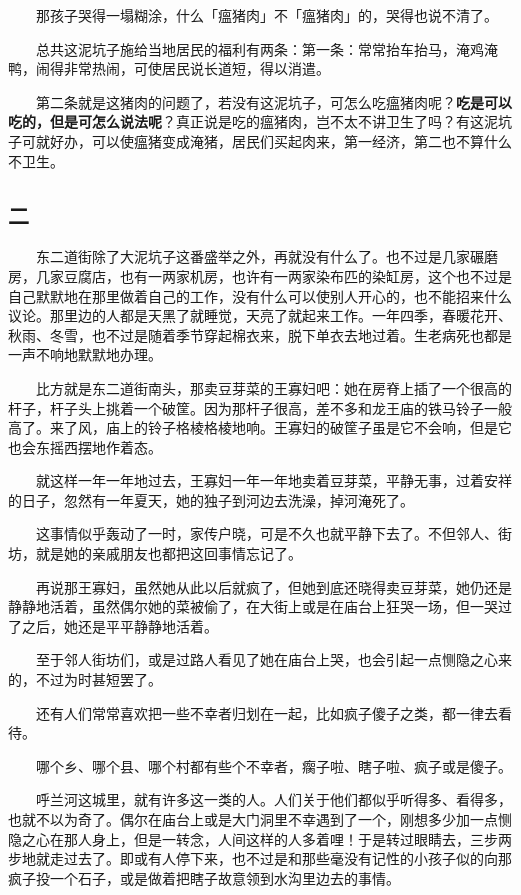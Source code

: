\documentclass[UTF8]{ctexart}
\begin{document}
　　那孩子哭得一塌糊涂，什么「瘟猪肉」不「瘟猪肉」的，哭得也说不清了。

　　总共这泥坑子施给当地居民的福利有两条：第一条：常常抬车抬马，淹鸡淹鸭，闹得非常热闹，可使居民说长道短，得以消遣。

　　第二条就是这猪肉的问题了，若没有这泥坑子，可怎么吃瘟猪肉呢？\textbf{吃是可以吃的，但是可怎么说法呢}？真正说是吃的瘟猪肉，岂不太不讲卫生了吗？有这泥坑子可就好办，可以使瘟猪变成淹猪，居民们买起肉来，第一经济，第二也不算什么不卫生。

\subsection{二}

　　东二道街除了大泥坑子这番盛举之外，再就没有什么了。也不过是几家碾磨房，几家豆腐店，也有一两家机房，也许有一两家染布匹的染缸房，这个也不过是自己默默地在那里做着自己的工作，没有什么可以使别人开心的，也不能招来什么议论。那里边的人都是天黑了就睡觉，天亮了就起来工作。一年四季，春暖花开、秋雨、冬雪，也不过是随着季节穿起棉衣来，脱下单衣去地过着。生老病死也都是一声不响地默默地办理。

　　比方就是东二道街南头，那卖豆芽菜的王寡妇吧：她在房脊上插了一个很高的杆子，杆子头上挑着一个破筐。因为那杆子很高，差不多和龙王庙的铁马铃子一般高了。来了风，庙上的铃子格棱格棱地响。王寡妇的破筐子虽是它不会响，但是它也会东摇西摆地作着态。

　　就这样一年一年地过去，王寡妇一年一年地卖着豆芽菜，平静无事，过着安祥的日子，忽然有一年夏天，她的独子到河边去洗澡，掉河淹死了。

　　这事情似乎轰动了一时，家传户晓，可是不久也就平静下去了。不但邻人、街坊，就是她的亲戚朋友也都把这回事情忘记了。

　　再说那王寡妇，虽然她从此以后就疯了，但她到底还晓得卖豆芽菜，她仍还是静静地活着，虽然偶尔她的菜被偷了，在大街上或是在庙台上狂哭一场，但一哭过了之后，她还是平平静静地活着。

　　至于邻人街坊们，或是过路人看见了她在庙台上哭，也会引起一点恻隐之心来的，不过为时甚短罢了。

　　还有人们常常喜欢把一些不幸者归划在一起，比如疯子傻子之类，都一律去看待。

　　哪个乡、哪个县、哪个村都有些个不幸者，瘸子啦、瞎子啦、疯子或是傻子。

　　呼兰河这城里，就有许多这一类的人。人们关于他们都似乎听得多、看得多，也就不以为奇了。偶尔在庙台上或是大门洞里不幸遇到了一个，刚想多少加一点恻隐之心在那人身上，但是一转念，人间这样的人多着哩！于是转过眼睛去，三步两步地就走过去了。即或有人停下来，也不过是和那些毫没有记性的小孩子似的向那疯子投一个石子，或是做着把瞎子故意领到水沟里边去的事情。
\end{document}
